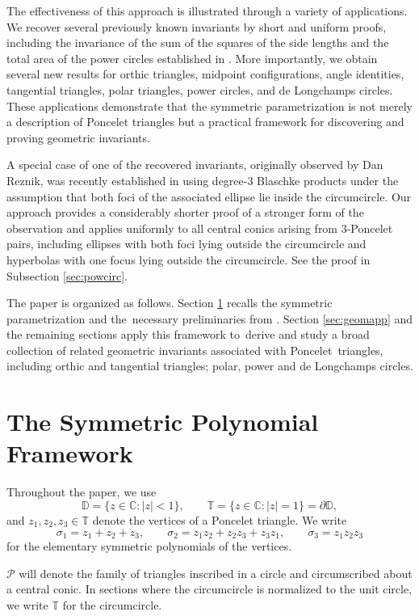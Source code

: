 \documentclass[11pt,reqno]{amsart}
\theoremstyle{definition}
\numberwithin{equation}{section}
\begin{document}
The effectiveness of this approach is illustrated through a variety of applications. We recover several previously known invariants by short and uniform proofs, including the invariance of the sum of the squares of the side lengths and the total area of the power circles established in \cite{Dragovic-Murad2026}. More importantly, we obtain several new results for orthic triangles, midpoint configurations, angle identities, tangential triangles, polar triangles, power circles, and de Longchamps circles. These applications demonstrate that the symmetric parametrization is not merely a description of Poncelet triangles but a practical framework for discovering and proving geometric invariants.

A special case of one of the recovered invariants, originally observed by Dan Reznik, was recently established in \cite{CelikDuguinGuoLuoSpinelliZeytuncuZhu2026} using degree-$3$ Blaschke products under the assumption that both foci of the associated ellipse lie inside the circumcircle. Our approach provides a considerably shorter proof of a stronger form of the observation and applies uniformly to all central conics arising from $3$-Poncelet pairs, including ellipses with both foci lying outside the circumcircle and hyperbolas with one focus lying  outside the circumcircle. See the proof in Subsection \ref{sec:powcirc}.

The paper is organized as follows. Section \ref{sec:sympolfra} recalls the symmetric parametrization and the \,necessary preliminaries from \cite{Murad2026b}. Section \ref{sec:geomapp} and the remaining sections apply this framework to \,derive and study a broad collection of related geometric invariants associated with Poncelet \,triangles, including orthic and tangential triangles; polar, power and de Longchamps circles.

\section{The Symmetric Polynomial Framework}\label{sec:sympolfra}
\noindent
Throughout the paper, we use
\[
\mathbb D=\{z\in\mathbb C:|z|<1\},\qquad
\mathbb T=\{z\in\mathbb C:|z|=1\}=\partial\mathbb D,
\]
and $z_1,z_2,z_3\in\mathbb T$ denote the vertices of a Poncelet triangle. We write
\[
\sigma_1=z_1+z_2+z_3,\qquad
\sigma_2=z_1z_2+z_2z_3+z_3z_1,\qquad
\sigma_3=z_1z_2z_3
\]
for the elementary symmetric polynomials of the vertices.

$\mathcal P$ will denote the family of triangles inscribed in a circle and circumscribed about a central conic. In sections where the circumcircle is normalized to the unit circle, we write $\mathbb T$ for the circumcircle.
\end{document}
